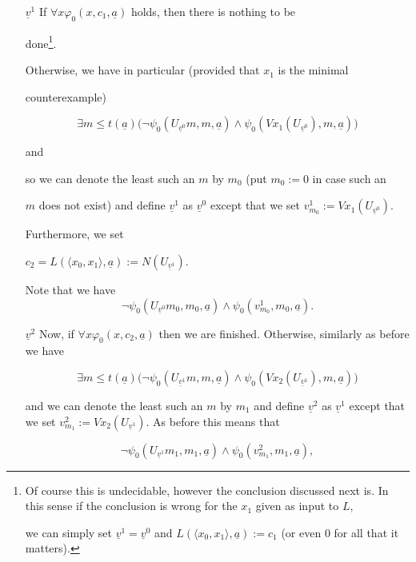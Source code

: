 \documentclass[1p]{elsarticle}
\newcommand{\tup}{\underline} %
\theoremstyle{plain}
\theoremstyle{definition}
\theoremstyle{remark}
\renewenvironment{proof}[1][]{\noindent{\bf Proof{#1}. }}{\nopagebreak[4]{\hspace*{\fill}


  $\Box$              %

 }{\vspace{2ex}}}
\renewcommand{\phi}{\varphi}
\theoremstyle{definition}
\begin{document}
{\begin{proof}
\begin{enumerate}
Set $\tup v^0:=0,\ldots,0$ and $c_1:=L(\langle x_0\rangle,\tup a):=

N(U_{\tup v^0})$.

\item[$\tup v^1$] If $\forall x \phi_0(x,c_1,\tup a)$ holds, then there is nothing to be 

done\footnote{

Of course this is undecidable, however the conclusion discussed next is. In this sense if the conclusion is wrong for the $x_1$ given as input to $L$, 

we can simply set $\tup v^1=\tup v^0$ and $L(\langle x_0,x_1\rangle,\tup a):=c_1$ (or even $0$ for all that it matters).

}. 

Otherwise, we have in particular (provided that $x_1$ is the minimal 

counterexample) 

\[

\exists m\leq t(\tup a) \big (\neg\psi_0(U_{\tup v^0}m,m,\tup a) \wedge \psi_0(Vx_1(U_{\tup v^0}),m,\tup a)\big)

\]

and 

so we can denote the least such an $m$ by $m_0$ (put $m_0:=0$ in case such an 

$m$ does not exist) and define $\tup v^1$ as $\tup v^0$ except that we set $v^1_{m_0}:=Vx_1(U_{\tup v^0})$.

Furthermore, we set 

$c_2=L(\langle x_0,x_1\rangle,\tup a):=N(U_{\tup v^1})$. 

Note that we have \[ \neg\psi_0(U_{\tup v^0}m_0,m_0,\tup a) \wedge \psi_0(v^1_{m_0},m_0,\tup a). \tag{v0}\label{e:v0}\]

\item[$\tup v^2$] Now, if $\forall x \phi_0(x,c_2,\tup a)$ then we are finished. Otherwise, similarly as before we have 

\[

\exists m\leq t(\tup a) \big (\neg\psi_0(U_{\tup v^1}m,m,\tup a) \wedge \psi_0(Vx_2(U_{\tup v^1}),m,\tup a)\big)

\]

and we can denote the least such an $m$ by $m_1$ and define $\tup v^2$ as $\tup v^1$ except that we set $v^2_{m_1}:=Vx_2(U_{\tup v^1})$. As before this means that

\[ \neg\psi_0(U_{\tup v^1}m_1,m_1,\tup a) \wedge \psi_0(v^2_{m_1},m_1,\tup a), \tag{v1}\label{e:v1}\]


\end{enumerate}
\end{proof}}
\end{document}
